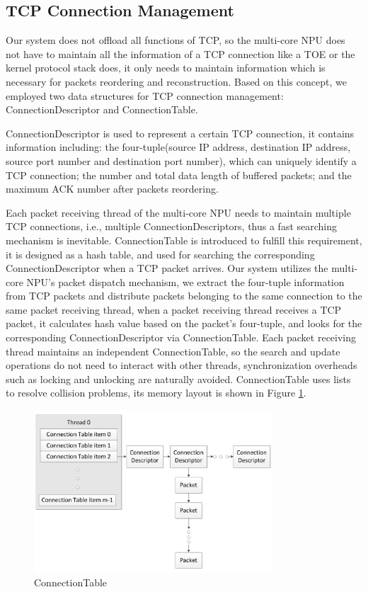\documentclass[conference]{IEEEtran}
\begin{document}
\subsection{TCP Connection Management}
Our system does not offload all functions of TCP, so the multi-core NPU does not have to maintain all the information of a TCP connection like a TOE or the kernel protocol stack does, it only needs to maintain information which is necessary for packets reordering and reconstruction. Based on this concept, we employed two data structures for TCP connection management: ConnectionDescriptor and ConnectionTable.

ConnectionDescriptor is used to represent a certain TCP connection, it contains information including: the four-tuple(source IP address, destination IP address, source port number and destination port number), which can uniquely identify a TCP connection; the number and total data length of buffered packets; and the maximum ACK number after packets reordering.

Each packet receiving thread of the multi-core NPU needs to maintain multiple TCP connections, i.e., multiple ConnectionDescriptors, thus a fast searching mechanism is inevitable. ConnectionTable is introduced to fulfill this requirement, it is designed as a hash table, and used for searching the corresponding ConnectionDescriptor when a TCP packet arrives. Our system utilizes the multi-core NPU's packet dispatch mechanism, we extract the four-tuple information from TCP packets and distribute packets belonging to the same connection to the same packet receiving thread, when a packet receiving thread receives a TCP packet, it calculates hash value based on the packet's four-tuple, and looks for the corresponding ConnectionDescriptor via ConnectionTable. Each packet receiving thread maintains an independent ConnectionTable, so the search and update operations do not need to interact with other threads, synchronization overheads such as locking and unlocking are naturally avoided. ConnectionTable uses lists to resolve collision problems, its memory layout is shown in Figure \ref{connection table}.
\begin{figure}[!t]
\centering
\includegraphics[width=3.5in]{connection_table}
\caption{ConnectionTable}
\label{connection table}
\end{figure}
\end{document}
